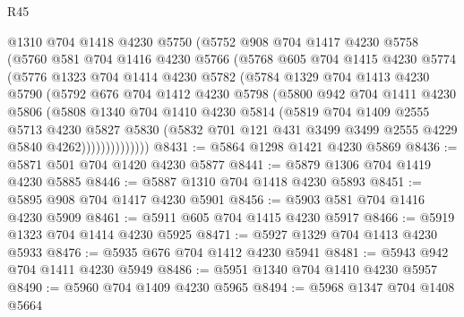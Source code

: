 \begin{lexlean}{R45}
\begin{coremodule}
            @1310
            @704
            @1418
            @4230
            @5750
            (@5752
              @908
              @704
              @1417
              @4230
              @5758
              (@5760
                @581
                @704
                @1416
                @4230
                @5766
                (@5768
                  @605
                  @704
                  @1415
                  @4230
                  @5774
                  (@5776
                    @1323
                    @704
                    @1414
                    @4230
                    @5782
                    (@5784
                      @1329
                      @704
                      @1413
                      @4230
                      @5790
                      (@5792
                        @676
                        @704
                        @1412
                        @4230
                        @5798
                        (@5800
                          @942
                          @704
                          @1411
                          @4230
                          @5806
                          (@5808
                            @1340
                            @704
                            @1410
                            @4230
                            @5814
                            (@5819
                              @704
                              @1409
                              @2555
                              @5713
                              @4230
                              @5827
                              @5830
                              (@5832
                                @701
                                @121
                                @431
                                @3499
                                @3499
                                @2555
                                @4229
                                @5840
                                @4262))))))))))))))
@8431 := @5864 @1298 @1421 @4230 @5869
@8436 := @5871 @501 @704 @1420 @4230 @5877
@8441 := @5879 @1306 @704 @1419 @4230 @5885
@8446 := @5887 @1310 @704 @1418 @4230 @5893
@8451 := @5895 @908 @704 @1417 @4230 @5901
@8456 := @5903 @581 @704 @1416 @4230 @5909
@8461 := @5911 @605 @704 @1415 @4230 @5917
@8466 := @5919 @1323 @704 @1414 @4230 @5925
@8471 := @5927 @1329 @704 @1413 @4230 @5933
@8476 := @5935 @676 @704 @1412 @4230 @5941
@8481 := @5943 @942 @704 @1411 @4230 @5949
@8486 := @5951 @1340 @704 @1410 @4230 @5957
@8490 := @5960 @704 @1409 @4230 @5965
@8494 := @5968 @1347 @704 @1408 @5664

\end{coremodule}
\end{lexlean}
